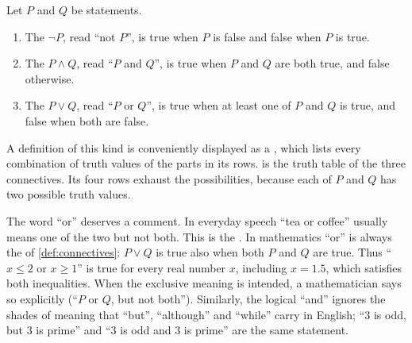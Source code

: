 \begin{definition}
\label{def:connectives}
Let $P$ and $Q$ be statements.
\begin{enumerate}
\item The  $\neg P$, read ``not $P$'', is true when $P$ is false and false when $P$ is true.
\item The  $P\wedge Q$, read ``$P$ and $Q$'', is true when $P$ and $Q$ are both true, and false otherwise.
\item The  $P\vee Q$, read ``$P$ or $Q$'', is true when at least one of $P$ and $Q$ is true, and false when both are false.
\end{enumerate}
\end{definition}

A definition of this kind is conveniently displayed as a , which lists every combination of truth values of the parts in its rows.  is the truth table of the three connectives. Its four rows exhaust the possibilities, because each of $P$ and $Q$ has two possible truth values.

\begin{table}
\end{table}

The word ``or'' deserves a comment. In everyday speech ``tea or coffee'' usually means one of the two but not both. This is the . In mathematics ``or'' is always the  of \cref{def:connectives}: $P\vee Q$ is true also when both $P$ and $Q$ are true. Thus ``$x\le 2$ or $x\ge 1$'' is true for every real number $x$, including $x=1.5$, which satisfies both inequalities. When the exclusive meaning is intended, a mathematician says so explicitly (``$P$ or $Q$, but not both''). Similarly, the logical ``and'' ignores the shades of meaning that ``but'', ``although'' and ``while'' carry in English; ``$3$ is odd, but $3$ is prime'' and ``$3$ is odd and $3$ is prime'' are the same statement.

